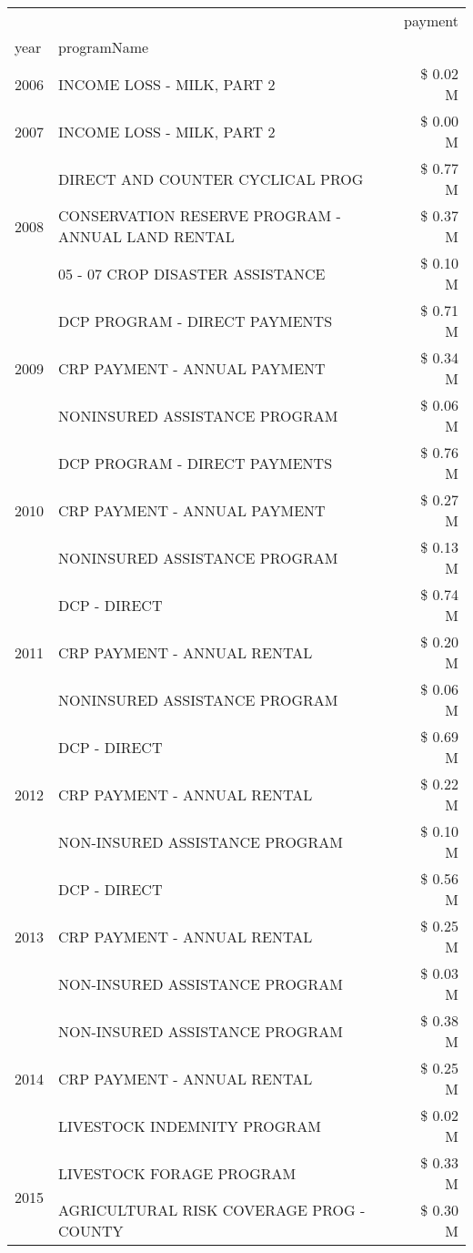 \begin{tabular}{llr}
\toprule
 &  & payment \\
year & programName &  \\
\midrule
2006 & INCOME LOSS - MILK, PART 2 & \$ 0.02 M \\
\cline{1-3}
2007 & INCOME LOSS - MILK, PART 2 & \$ 0.00 M \\
\cline{1-3}
\multirow[t]{3}{*}{2008} & DIRECT AND COUNTER CYCLICAL PROG & \$ 0.77 M \\
 & CONSERVATION RESERVE PROGRAM - ANNUAL LAND RENTAL & \$ 0.37 M \\
 & 05 - 07 CROP DISASTER ASSISTANCE & \$ 0.10 M \\
\cline{1-3}
\multirow[t]{3}{*}{2009} & DCP PROGRAM - DIRECT PAYMENTS & \$ 0.71 M \\
 & CRP PAYMENT - ANNUAL PAYMENT & \$ 0.34 M \\
 & NONINSURED ASSISTANCE PROGRAM & \$ 0.06 M \\
\cline{1-3}
\multirow[t]{3}{*}{2010} & DCP PROGRAM - DIRECT PAYMENTS & \$ 0.76 M \\
 & CRP PAYMENT - ANNUAL PAYMENT & \$ 0.27 M \\
 & NONINSURED ASSISTANCE PROGRAM & \$ 0.13 M \\
\cline{1-3}
\multirow[t]{3}{*}{2011} & DCP - DIRECT & \$ 0.74 M \\
 & CRP PAYMENT - ANNUAL RENTAL & \$ 0.20 M \\
 & NONINSURED ASSISTANCE PROGRAM & \$ 0.06 M \\
\cline{1-3}
\multirow[t]{3}{*}{2012} & DCP - DIRECT & \$ 0.69 M \\
 & CRP PAYMENT - ANNUAL RENTAL & \$ 0.22 M \\
 & NON-INSURED ASSISTANCE PROGRAM & \$ 0.10 M \\
\cline{1-3}
\multirow[t]{3}{*}{2013} & DCP - DIRECT & \$ 0.56 M \\
 & CRP PAYMENT - ANNUAL RENTAL & \$ 0.25 M \\
 & NON-INSURED ASSISTANCE PROGRAM & \$ 0.03 M \\
\cline{1-3}
\multirow[t]{3}{*}{2014} & NON-INSURED ASSISTANCE PROGRAM & \$ 0.38 M \\
 & CRP PAYMENT - ANNUAL RENTAL & \$ 0.25 M \\
 & LIVESTOCK INDEMNITY PROGRAM & \$ 0.02 M \\
\cline{1-3}
\multirow[t]{3}{*}{2015} & LIVESTOCK FORAGE PROGRAM & \$ 0.33 M \\
 & AGRICULTURAL RISK COVERAGE PROG - COUNTY & \$ 0.30 M \\

\end{tabular}

